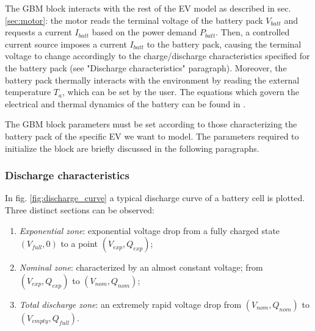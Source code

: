 The GBM block interacts with the rest of the EV model as described in sec. \ref{sec:motor}: the motor reads the terminal voltage of the battery pack $V_{batt}$ and requests a current $I_{batt}$ based on the power demand $P_{batt}$. Then, a controlled current source imposes a current $I_{batt}$ to the battery pack, causing the terminal voltage to change accordingly to the charge/discharge characteristics specified for the battery pack (see "Discharge characteristics" paragraph). Moreover, the battery pack thermally interacts with the environment by reading the external temperature $T_a$, which can be set by the user. The equations which govern the electrical and thermal dynamics of the battery can be found in \cite{mathworks:battery}.

The GBM block parameters must be set according to those characterizing the battery pack of the specific EV we want to model. The parameters required to initialize the block are briefly discussed in the following paragraphs.

\subsubsection{Discharge characteristics}
\label{sec:discharge_characteristics}
In fig. \ref{fig:discharge_curve} a typical discharge curve of a battery cell is plotted. Three distinct sections can be observed:
\begin{enumerate}
    \item \textit{Exponential zone}: exponential voltage drop from a fully charged state $(V_{full},0)$ to a point $(V_{exp},Q_{exp})$;
    \item \textit{Nominal zone}: characterized by an almost constant voltage; from $(V_{exp},Q_{exp})$ to $(V_{nom},Q_{nom})$;
    \item \textit{Total discharge zone}: an extremely rapid voltage drop from $(V_{nom},Q_{nom})$ to $(V_{empty},Q_{full})$.
\end{enumerate}

